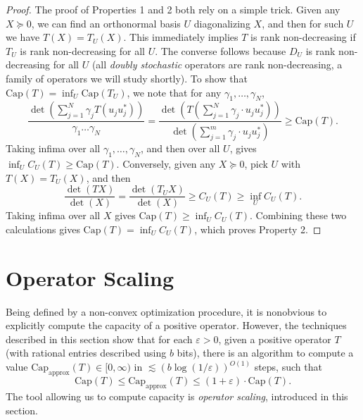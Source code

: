 \documentclass[12pt]{article}
\begin{document}
\begin{proof}
    The proof of Properties 1 and 2 both rely on a simple trick. Given any $X \succeq 0$, we can find an orthonormal basis $U$ diagonalizing $X$, and then for such $U$ we have $T(X) = T_U(X)$. This immediately implies $T$ is rank non-decreasing if $T_U$ is rank non-decreasing for all $U$. The converse follows because $D_U$ is rank non-decreasing for all $U$ (all \emph{doubly stochastic} operators are rank non-decreasing, a family of operators we will study shortly). To show that $\text{Cap}(T) = \inf_U \text{Cap}(T_U)$, we note that for any $\gamma_1,\dots, \gamma_N$,
    \begin{equation} \label{UCapacityUpperBound}
        \frac{\det \left( \sum_{j = 1}^N \gamma_j T(u_j u_j^*) \right)}{\gamma_1 \dots \gamma_N} = \frac{\det \left( T \left( \sum_{j = 1}^N \gamma_j \cdot u_j u_j^* \right) \right)}{\det \left( \sum_{j = 1}^m \gamma_j \cdot u_j u_j^* \right)} \geq \text{Cap}(T).
    \end{equation}
    Taking infima over all $\gamma_1,\dots,\gamma_N$, and then over all $U$, gives $\inf_U C_U(T) \geq \text{Cap}(T)$. Conversely, given any $X \succeq 0$, pick $U$ with $T(X) = T_U(X)$, and then
    \begin{equation} \label{UCapacityLowerBound}
        \frac{\det(TX)}{\det(X)} = \frac{\det(T_U X)}{\det(X)} \geq C_U(T) \geq \inf_U C_U(T).
    \end{equation}
    Taking infima over all $X$ gives $\text{Cap}(T) \geq \inf_U C_U(T)$. Combining these two calculations gives $\text{Cap}(T) = \inf_U C_U(T)$, which proves Property 2.
\end{proof}

\section{Operator Scaling}

Being defined by a non-convex optimization procedure, it is nonobvious to explicitly compute the capacity of a positive operator. However, the techniques described in this section show that for each $\varepsilon > 0$, given a positive operator $T$ (with rational entries described using $b$ bits), there is an algorithm to compute a value $\text{Cap}_{\text{approx}}(T) \in [0,\infty)$ in $\lesssim (b \log(1/\varepsilon))^{O(1)}$ steps, such that
%
\[ \text{Cap}(T) \leq \text{Cap}_{\text{approx}}(T) \leq (1 + \varepsilon) \cdot \text{Cap}(T). \]
%
The tool allowing us to compute capacity is \emph{operator scaling}, introduced in this section.
\end{document}
